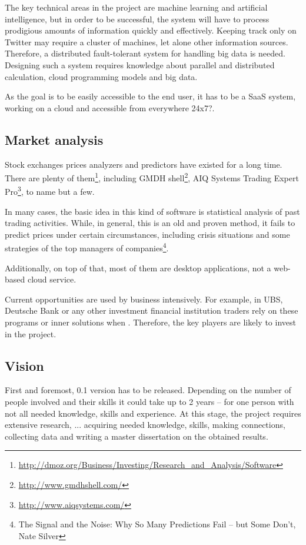 \documentclass[a4paper,12pt]{article}
\begin{document}
The key technical areas in the project are machine learning and artificial intelligence, but in order to be successful, the system will have to process prodigious amounts of information quickly and effectively. Keeping track only on Twitter may require a cluster of machines, let alone other information sources. Therefore, a distributed fault-tolerant system for handling big data is needed. Designing such a system requires knowledge about parallel and distributed calculation, cloud programming models and big data.

As the goal is to be easily accessible to the end user, it has to be a SaaS system, working on a cloud and accessible from everywhere 24x7?.

\subsection*{Market analysis}

Stock exchanges prices analyzers and predictors have existed for a long time. There are plenty of them\footnote{\url{http://dmoz.org/Business/Investing/Research\_and\_Analysis/Software}}, including GMDH shell\footnote{\url{http://www.gmdhshell.com/}}, AIQ Systems Trading Expert Pro\footnote{\url{http://www.aiqsystems.com/}}, to name but a few.

In many cases, the basic idea in this kind of software is statistical analysis of past trading activities. While, in general, this is an old and proven method, it fails to predict prices under certain circumstances, including crisis situations and some strategies of the top managers of companies\footnote{The Signal and the Noise: Why So Many Predictions Fail -- but Some Don't, Nate Silver}.

Additionally, on top of that, most of them are desktop applications, not a web-based cloud service.

Current opportunities are used by business intensively. For example, in UBS, Deutsche Bank or any other investment financial institution traders rely on these programs or inner solutions when . Therefore, the key players are likely to invest in the project.

\subsection*{Vision}

First and foremost, 0.1 version has to be released. Depending on the number of people involved and their skills it could take up to 2 years -- for one person with not all needed knowledge, skills and experience. At this stage, the project requires extensive research, ... acquiring needed knowledge, skills, making connections, collecting data and writing a master dissertation on the obtained results.
\end{document}
